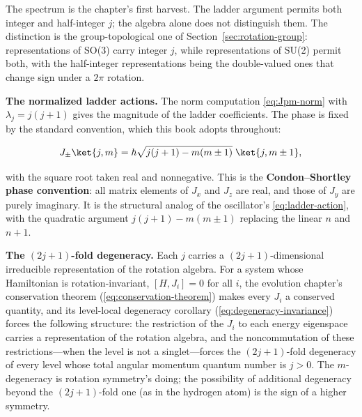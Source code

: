 The spectrum is the chapter's first harvest. The ladder argument permits both integer and half-integer $j$; the algebra alone does not distinguish them. The distinction is the group-topological one of Section~\ref{sec:rotation-group}: representations of SO(3) carry integer $j$, while representations of SU(2) permit both, with the half-integer representations being the double-valued ones that change sign under a $2\pi$ rotation.

\medskip\noindent\textbf{The normalized ladder actions.} The norm computation \eqref{eq:Jpm-norm} with $\lambda_j=j(j+1)$ gives the magnitude of the ladder coefficients. The phase is fixed by the standard convention, which this book adopts throughout:
\begin{linenomath}
    \begin{equation}
        J_\pm\ket{j,m} = \hbar\sqrt{j(j+1)-m(m\pm1)}\;\ket{j,m\pm1},
        \label{eq:ladder-action-j}
    \end{equation}
\end{linenomath}
with the square root taken real and nonnegative. This is the \textbf{Condon--Shortley phase convention}: all matrix elements of $J_x$ and $J_z$ are real, and those of $J_y$ are purely imaginary. It is the structural analog of the oscillator's \eqref{eq:ladder-action}, with the quadratic argument $j(j+1)-m(m\pm1)$ replacing the linear $n$ and $n+1$.

\medskip\noindent\textbf{The $(2j+1)$-fold degeneracy.} Each $j$ carries a $(2j+1)$-dimensional irreducible representation of the rotation algebra. For a system whose Hamiltonian is rotation-invariant, $[H,J_i]=0$ for all $i$, the evolution chapter's conservation theorem (\eqref{eq:conservation-theorem}) makes every $J_i$ a conserved quantity, and its level-local degeneracy corollary (\eqref{eq:degeneracy-invariance}) forces the following structure: the restriction of the $J_i$ to each energy eigenspace carries a representation of the rotation algebra, and the noncommutation of these restrictions---when the level is not a singlet---forces the $(2j+1)$-fold degeneracy of every level whose total angular momentum quantum number is $j>0$. The $m$-degeneracy is rotation symmetry's doing; the possibility of additional degeneracy beyond the $(2j+1)$-fold one (as in the hydrogen atom) is the sign of a higher symmetry.

